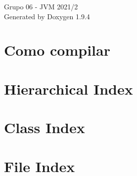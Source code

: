 \documentclass[twoside]{book}
\newcommand{\+}{\discretionary{\mbox{\scriptsize$\hookleftarrow$}}{}{}}
\newcommand{\clearemptydoublepage}{%
    \newpage{\pagestyle{empty}\cleardoublepage}%
  }
\begin{document}
  \raggedbottom
    \hypersetup{pageanchor=false,
                bookmarksnumbered=true,
                pdfencoding=unicode
               }
  \begin{titlepage}
  \vspace*{7cm}
  \begin{center}%
  {\Large Grupo 06 -\/  JVM 2021/2}\\
  \vspace*{1cm}
  {\large Generated by Doxygen 1.9.4}\\
  \end{center}
  \end{titlepage}
  \clearemptydoublepage
  \tableofcontents
  \clearemptydoublepage
  \hypersetup{pageanchor=true}
\chapter{Como compilar}
\label{index}\hypertarget{index}{}
\chapter{Hierarchical Index}

\chapter{Class Index}

\chapter{File Index}

\end{document}

